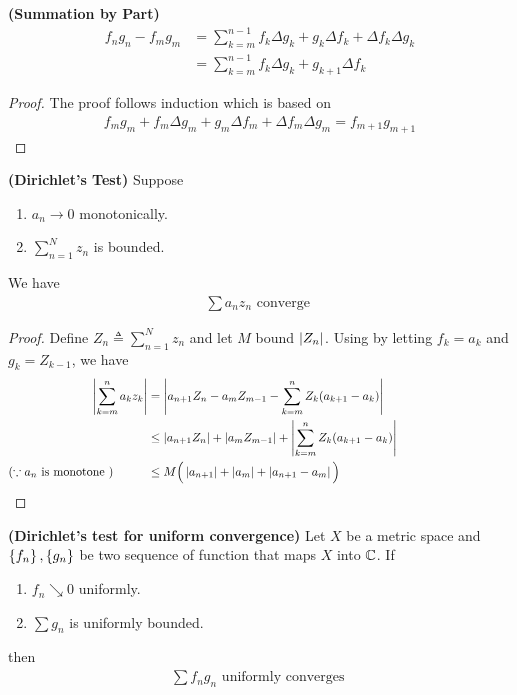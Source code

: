 \documentclass{report}
\begin{document}
\begin{theorem}
\label{Summation by Part}
\textbf{(Summation by Part)} 
\begin{align*}
  f_ng_n-f_mg_m&=\sum_{k=m}^{n-1}f_k \Delta g_k + g_k \Delta f_k+ \Delta f_k \Delta g_k \\
  &=\sum_{k=m}^{n-1}f_k \Delta g_k + g_{k+1}\Delta f_k
\end{align*}
\end{theorem}
\begin{proof}
The proof follows induction which is based on 
\begin{align*}
f_mg_m+ f_m\Delta g_m+ g_m \Delta f_m +\Delta f_m \Delta g_m=f_{m+1}g_{m+1}
\end{align*} 
\end{proof}
\begin{theorem}
\label{Dirichlet's Test}
\textbf{(Dirichlet's Test)} Suppose 
\begin{enumerate}[label=(\alph*)]
  \item $a_n\to 0$ monotonically. 
  \item $\sum_{n=1}^N z_n$ is bounded.
\end{enumerate}
We have 
\begin{align*}
\sum a_nz_n\text{ converge }
\end{align*}
\end{theorem}
\begin{proof}
Define $Z_n\triangleq \sum_{n=1}^N z_n$ and let $M$ bound  $\left|Z_n\right|$. Using  by letting $f_k=a_k$ and $g_k=Z_{k-1}$, we have
\begin{align*}
  \abso{\sum_{k=m}^{n}a_kz_k}&= \abso{a_{n+1}Z_n- a_mZ_{m-1}- \sum_{k=m}^n Z_k(a_{k+1}-a_k)}\\
                             &\leq \abso{a_{n+1}Z_n}+ \abso{a_mZ_{m-1}}+ \abso{\sum_{k=m}^n Z_k (a_{k+1}-a_k)}\\
  (\because a_n\text{ is monotone })\hspace{1cm}&\leq M\Big(\abso{a_{n+1}}+\abso{a_{m}}+\abso{a_{n+1}-a_m} \Big)\hspace{5cm}
\end{align*}
\end{proof}
\begin{theorem}
\label{THDtfuc}
\textbf{(Dirichlet's test for uniform convergence)} Let $X$ be a metric space and $\left\{ f_n \right\},\left\{ g_n \right\}$ be two sequence of function that maps $X$ into $\mathbb{C}$. If
\begin{enumerate}[label=(\roman*)]
  \item $f_n\searrow 0$ uniformly. 
  \item $\sum g_n$ is uniformly bounded. 
\end{enumerate}
then 
\begin{align*}
\sum f_ng_n\text{ uniformly converges }
\end{align*}
\end{theorem}
\end{document}
